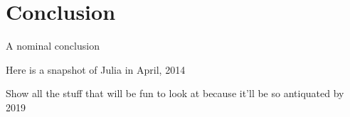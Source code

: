 \chapter{Conclusion}

A nominal conclusion

Here is a snapshot of Julia in April, 2014

Show all the stuff that will be fun to look at because it\textquoteright{}ll
be so antiquated by 2019


